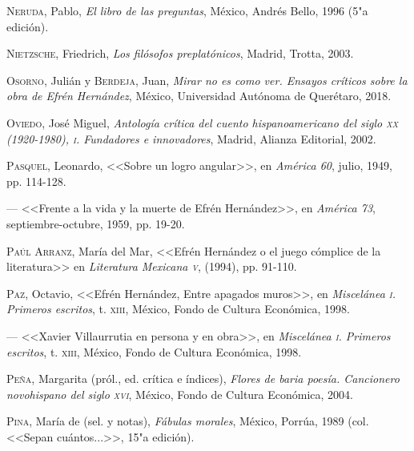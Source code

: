 \documentclass[14pt,twoside,final]{extbook} %
\begin{document}
\textsc{Neruda}, Pablo, \emph{El libro de las preguntas}, México, Andrés Bello, 1996 (5"a edición).\label{bib:neruda1996}

\textsc{Nietzsche}, Friedrich, \emph{Los filósofos preplatónicos}, Madrid, Trotta, 2003.\label{bib:nietzche2003}

\textsc{Osorno}, Julián y \textsc{Berdeja}, Juan, \emph{Mirar no es como ver. Ensayos críticos sobre la obra de Efrén Hernández}, México, Universidad Autónoma de Querétaro, 2018.\label{bib:osorno2018}

\textsc{Oviedo}, José Miguel, \emph{Antología crítica del cuento hispanoamericano del siglo \textsc{xx} (1920-1980), \textsc{i}. Fundadores e innovadores}, Madrid, Alianza Editorial, 2002.\label{bib:oviedo2002}

\textsc{Pasquel}, Leonardo, <<Sobre un logro angular>>, en \emph{América 60}, julio, 1949, pp. 114-128.\label{bib:pasquel1949}

--- <<Frente a la vida y la muerte de Efrén Hernández>>, en \emph{América 73}, sep\-tiembre-octubre, 1959, pp. 19-20.\label{bib:pasquel1959}

\textsc{Paúl Arranz}, María del Mar, <<Efrén Hernández o el juego cómplice de la literatura>> en \emph{Literatura Mexicana \textsc{v}}, (1994), pp. 91-110.\label{bib:paul1994}

\textsc{Paz}, Octavio, <<Efrén Hernández, Entre apagados muros>>, en \emph{Miscelánea \textsc{i}. Primeros escritos}, t. \textsc{xiii}, México, Fondo de Cultura Económica, 1998.\label{bib:paz1998a}

--- <<Xavier Villaurrutia en persona y en obra>>, en \emph{Miscelánea \textsc{i}. Primeros escritos}, t. \textsc{xiii}, México, Fondo de Cultura Económica, 1998.\label{bib:paz1998b}

\textsc{Peña}, Margarita (pról., ed. crítica e índices), \emph{Flores de baria poesía. Cancionero novohispano del siglo \textsc{xvi}}, México, Fondo de Cultura Económica, 2004.\label{bib:peña2004}

\textsc{Pina}, María de (sel. y notas), \emph{Fábulas morales}, México, Porrúa, 1989 (col. <<Sepan cuántos...>>, 15"a edición).\label{bib:pina1989}
\end{document}
